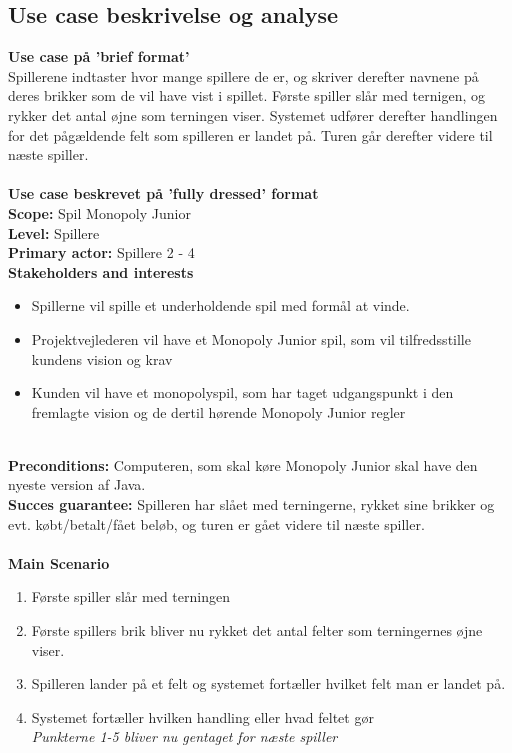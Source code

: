 \documentclass{article}
\begin{document}
\subsection{Use case beskrivelse og analyse }
\textbf{Use case på 'brief format'}\\
Spillerene indtaster hvor mange spillere de er, og skriver derefter navnene på deres brikker som de vil have vist i spillet. Første spiller slår med ternigen, og rykker det antal øjne som terningen viser. Systemet udfører derefter handlingen for det pågældende felt som spilleren er landet på. Turen går derefter videre til næste spiller.
\\
\\
\textbf{Use case beskrevet på 'fully dressed' format}
\\
\textbf{Scope:} Spil Monopoly Junior 
\\
\textbf{Level:} Spillere
\\
\textbf{Primary actor:} Spillere 2 - 4 
\\
\textbf{Stakeholders and interests} 
\begin{itemize}
    \item Spillerne vil spille et underholdende spil med formål at vinde. 
    \item Projektvejlederen vil have et Monopoly Junior spil, som vil tilfredsstille kundens vision og krav
    \item Kunden vil have et monopolyspil, som har taget udgangspunkt i den fremlagte vision og de dertil hørende Monopoly Junior regler 
\end{itemize}
\\
\textbf{Preconditions:} Computeren, som skal køre Monopoly Junior skal have den nyeste version af Java. 
\\
\textbf{Succes guarantee:} Spilleren har slået med terningerne, rykket sine brikker og evt. købt/betalt/fået beløb, og turen er gået videre til næste spiller. 
\\
\\
\textbf{Main Scenario}
\begin{enumerate}
\itemsep-0.5em
    \item Første spiller slår med terningen
    \item Første spillers brik bliver nu rykket det antal felter som terningernes øjne viser.
    \item Spilleren lander på et felt og systemet fortæller hvilket felt man er landet på.
    \item Systemet fortæller hvilken handling eller hvad feltet gør\\
    \textit{Punkterne 1-5 bliver nu gentaget for næste spiller}
\end{enumerate}
\end{document}
